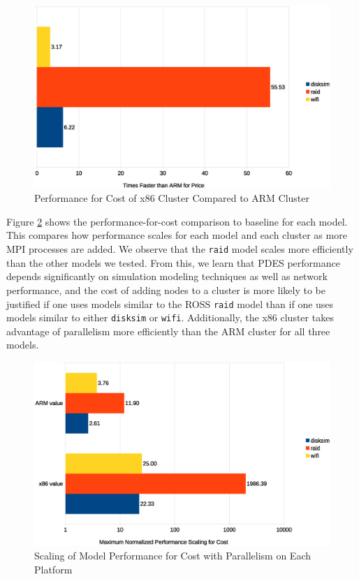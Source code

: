 \documentclass[11pt]{book}
\begin{document}
\begin{figure}
\centering
\includegraphics[width=\textwidth]{costperf}
\caption{Performance for Cost of x86 Cluster Compared to ARM Cluster}
\label{costperf}
\end{figure}

Figure \ref{costperf-summary} shows the performance-for-cost comparison
to baseline for each model. This compares how performance scales for each model
and each cluster as more MPI processes are added. We observe that the
\verb;raid; model scales more efficiently than the other models we tested. From
this, we learn that PDES performance depends significantly on simulation
modeling techniques as well as network performance, and the cost of adding nodes
to a cluster is more likely to be justified if one uses models similar to the
ROSS \verb;raid; model than if one uses models similar to either \verb;disksim;
or \verb;wifi;. Additionally, the x86 cluster takes advantage of parallelism
more efficiently than the ARM cluster for all three models.

\begin{figure}
\centering
\includegraphics[width=\textwidth]{costperf_summary}
\caption{Scaling of Model Performance for Cost with Parallelism on Each Platform}
\label{costperf-summary}
\end{figure}
\end{document}

